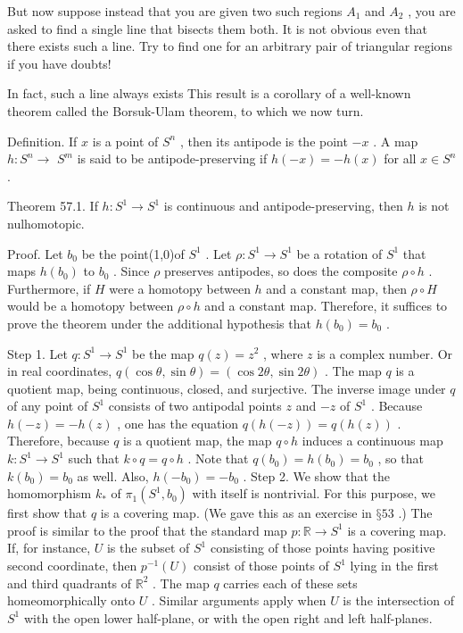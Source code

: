 But now suppose instead that you are given two such regions \({A}_{1}\) and \({A}_{2}\) , you are asked to find a single line that bisects them both. It is not obvious even that there exists such a line. Try to find one for an arbitrary pair of triangular regions if you have doubts!

In fact, such a line always exists This result is a corollary of a well-known theorem called the Borsuk-Ulam theorem, to which we now turn.

Definition. If \(x\) is a point of \({S}^{n}\) , then its antipode is the point \(- x\) . A map \(h : {S}^{n} \rightarrow\)  \({S}^{m}\) is said to be antipode-preserving if \(h\left( {-x}\right)  =  - h\left( x\right)\) for all \(x \in  {S}^{n}\) .

Theorem 57.1. If \(h : {S}^{1} \rightarrow  {S}^{1}\) is continuous and antipode-preserving, then \(h\) is not nulhomotopic.

Proof. Let \({b}_{0}\) be the point(1,0)of \({S}^{1}\) . Let \(\rho  : {S}^{1} \rightarrow  {S}^{1}\) be a rotation of \({S}^{1}\) that maps \(h\left( {b}_{0}\right)\) to \({b}_{0}\) . Since \(\rho\) preserves antipodes, so does the composite \(\rho  \circ  h\) . Furthermore, if \(H\) were a homotopy between \(h\) and a constant map, then \(\rho  \circ  H\) would be a homotopy between \(\rho  \circ  h\) and a constant map. Therefore, it suffices to prove the theorem under the additional hypothesis that \(h\left( {b}_{0}\right)  = {b}_{0}\) .

Step 1. Let \(q : {S}^{1} \rightarrow  {S}^{1}\) be the map \(q\left( z\right)  = {z}^{2}\) , where \(z\) is a complex number. Or in real coordinates, \(q\left( {\cos \theta ,\sin \theta }\right)  = \left( {\cos {2\theta },\sin {2\theta }}\right)\) . The map \(q\) is a quotient map, being continuous, closed, and surjective. The inverse image under \(q\) of any point of \({S}^{1}\) consists of two antipodal points \(z\) and \(- z\) of \({S}^{1}\) . Because \(h\left( {-z}\right)  =  - h\left( z\right)\) , one has the equation \(q\left( {h\left( {-z}\right) }\right)  = q\left( {h\left( z\right) }\right)\) . Therefore, because \(q\) is a quotient map, the map \(q \circ  h\) induces a continuous map \(k : {S}^{1} \rightarrow  {S}^{1}\) such that \(k \circ  q = q \circ  h\) . Note that \(q\left( {b}_{0}\right)  = h\left( {b}_{0}\right)  = {b}_{0}\) , so that \(k\left( {b}_{0}\right)  = {b}_{0}\) as well. Also, \(h\left( {-{b}_{0}}\right)  =  - {b}_{0}\) . Step 2. We show that the homomorphism \({k}_{ * }\) of \({\pi }_{1}\left( {{S}^{1},{b}_{0}}\right)\) with itself is nontrivial. For this purpose, we first show that \(q\) is a covering map. (We gave this as an exercise in \(§{53}\) .) The proof is similar to the proof that the standard map \(p : \mathbb{R} \rightarrow  {S}^{1}\) is a covering map. If, for instance, \(U\) is the subset of \({S}^{1}\) consisting of those points having positive second coordinate, then \({p}^{-1}\left( U\right)\) consist of those points of \({S}^{1}\) lying in the first and third quadrants of \({\mathbb{R}}^{2}\) . The map \(q\) carries each of these sets homeomorphically onto \(U\) . Similar arguments apply when \(U\) is the intersection of \({S}^{1}\) with the open lower half-plane, or with the open right and left half-planes.

